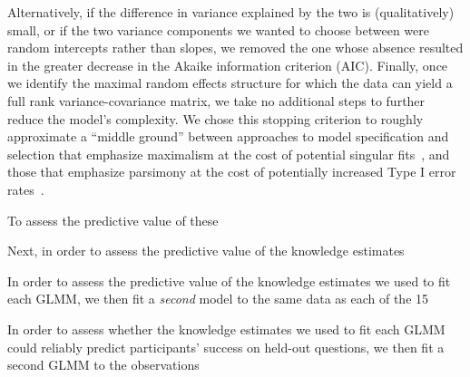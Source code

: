 \documentclass[10pt]{article}
\begin{document}
Alternatively, if the difference in variance explained by the two is (qualitatively) small, or if the two variance components we wanted to choose between were random intercepts rather than slopes, we removed the one whose absence resulted in the greater decrease in the Akaike information criterion (AIC).
Finally, once we identify the maximal random effects structure for which the data can yield a full rank variance-covariance matrix, we take no additional steps to further reduce the model's complexity. 
We chose this stopping criterion to roughly approximate a ``middle ground'' between approaches to model specification and selection that emphasize maximalism at the cost of potential singular fits~\citep[e.g.,~][]{BarrEtal13}, and those that emphasize parsimony at the cost of potentially increased Type I error rates~\citep[e.g.,~][]{BateEtal15b}. 

To assess the predictive value of these 



Next, in order to assess the predictive value of the knowledge estimates 



In order to assess the predictive value of the knowledge estimates we used to fit each GLMM, we then fit a \textit{second} model to the same data as each of the 15 

In order to assess whether the knowledge estimates we used to fit each GLMM could reliably predict participants' success on held-out questions, we then fit a second GLMM to the observations 
\end{document}
